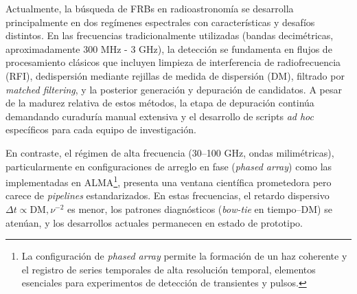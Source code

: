 
\medskip

Actualmente, la búsqueda de FRBs en radioastronomía se desarrolla principalmente en dos regímenes espectrales con características y desafíos distintos. En las frecuencias tradicionalmente utilizadas (bandas decimétricas, aproximadamente 300 MHz - 3 GHz), la detección se fundamenta en flujos de procesamiento clásicos que incluyen limpieza de interferencia de radiofrecuencia (RFI), dedispersión mediante rejillas de medida de dispersión (DM), filtrado por \emph{matched filtering}, y la posterior generación y depuración de candidatos. A pesar de la madurez relativa de estos métodos, la etapa de depuración continúa demandando curaduría manual extensiva y el desarrollo de scripts \emph{ad hoc} específicos para cada equipo de investigación.


En contraste, el régimen de alta frecuencia (30--100 GHz, ondas milimétricas), particularmente en configuraciones de arreglo en fase (\emph{phased array}) como las implementadas en ALMA\footnote{La configuración de \emph{phased array} permite la formación de un haz coherente y el registro de series temporales de alta resolución temporal, elementos esenciales para experimentos de detección de transientes y pulsos.}, presenta una ventana científica prometedora pero carece de \textit{pipelines} estandarizados. En estas frecuencias, el retardo dispersivo $\Delta t\propto \mathrm{DM},\nu^{-2}$ es menor, los patrones diagnósticos (\emph{bow-tie} en tiempo--DM) se atenúan, y los desarrollos actuales permanecen en estado de prototipo.


